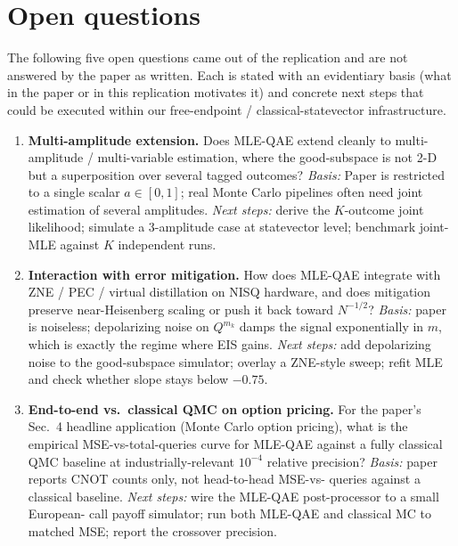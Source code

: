 \section{Open questions}

The following five open questions came out of the replication and are not
answered by the paper as written. Each is stated with an evidentiary basis
(what in the paper or in this replication motivates it) and concrete next
steps that could be executed within our free-endpoint / classical-statevector
infrastructure.

\begin{enumerate}
    \item \textbf{Multi-amplitude extension.} Does MLE-QAE extend cleanly to
    multi-amplitude / multi-variable estimation, where the good-subspace is
    not 2-D but a superposition over several tagged outcomes?
    \emph{Basis:} Paper is restricted to a single scalar $a\in[0,1]$; real
    Monte Carlo pipelines often need joint estimation of several amplitudes.
    \emph{Next steps:} derive the $K$-outcome joint likelihood; simulate a
    3-amplitude case at statevector level; benchmark joint-MLE against $K$
    independent runs.

    \item \textbf{Interaction with error mitigation.} How does MLE-QAE
    integrate with ZNE / PEC / virtual distillation on NISQ hardware, and
    does mitigation preserve near-Heisenberg scaling or push it back toward
    $N^{-1/2}$?
    \emph{Basis:} paper is noiseless; depolarizing noise on $Q^{m_k}$ damps
    the signal exponentially in $m$, which is exactly the regime where EIS
    gains.
    \emph{Next steps:} add depolarizing noise to the good-subspace simulator;
    overlay a ZNE-style sweep; refit MLE and check whether slope stays below
    $-0.75$.

    \item \textbf{End-to-end vs.\ classical QMC on option pricing.} For the
    paper's Sec.\ 4 headline application (Monte Carlo option pricing), what
    is the empirical MSE-vs-total-queries curve for MLE-QAE against a fully
    classical QMC baseline at industrially-relevant $10^{-4}$ relative
    precision?
    \emph{Basis:} paper reports CNOT counts only, not head-to-head MSE-vs-
    queries against a classical baseline.
    \emph{Next steps:} wire the MLE-QAE post-processor to a small European-
    call payoff simulator; run both MLE-QAE and classical MC to matched MSE;
    report the crossover precision.


\end{enumerate}
